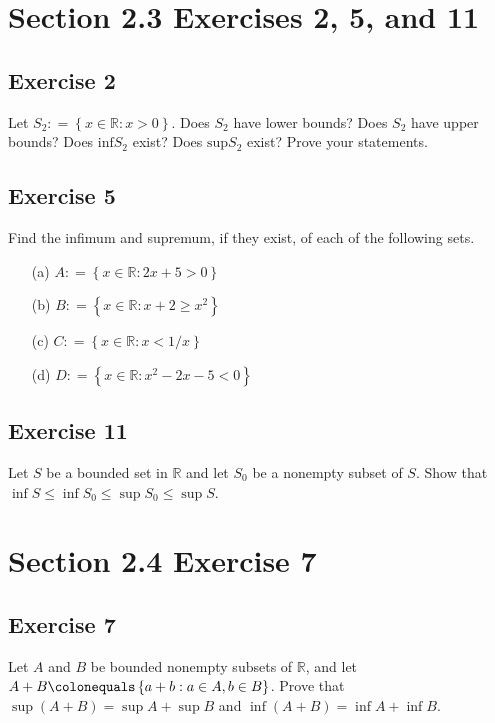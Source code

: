 \documentclass[12pt]{article}
\begin{document}
\begin{flushleft}
\section*{Section 2.3 Exercises 2, 5, and 11}

\subsection*{Exercise 2}
Let $S_2 \mathrel{\mathop:}= \left\{x \in \mathbb{R} : x > 0\right\}$. Does $S_2$ have lower bounds? Does $S_2$ have upper bounds? Does $\text{inf}S_2$ exist? Does $\text{sup}S_2$ exist? Prove your statements.

\subsection*{Exercise 5}
Find the infimum and supremum, if they exist, of each of the following sets.
\begin{itemize}
\item[(a)] $A \mathrel{\mathop:}= \left\{x \in \mathbb{R} : 2x + 5 > 0\right\}$
\item[(b)] $B \mathrel{\mathop:}= \left\{x \in \mathbb{R} : x + 2 \geq x^2\right\}$
\item[(c)] $C \mathrel{\mathop:}= \left\{x \in \mathbb{R} : x < 1/x\right\}$
\item[(d)] $D \mathrel{\mathop:}= \left\{x \in \mathbb{R} : x^2 - 2x - 5 < 0\right\}$
\end{itemize}

\subsection*{Exercise 11}
Let $S$ be a bounded set in $\mathbb{R}$ and let $S_0$ be a nonempty subset of $S$. Show that $\inf S \leq \inf S_0 \leq \sup S_0 \leq \sup S$.

\section*{Section 2.4 Exercise 7}

\subsection*{Exercise 7}

Let $A$ and $B$ be bounded nonempty subsets of $\mathbb{R}$, and let $A + B \colonequals \left\{a + b : a \in A, b \in B\right\}$. Prove that $\sup\left(A + B\right) = \sup A + \sup B$ and $\inf \left(A + B\right) = \inf A + \inf B$.

\end{flushleft}
\end{document}
